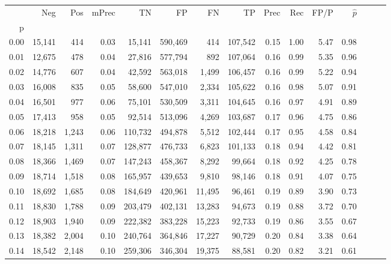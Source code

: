 \begin{tabular}{rrrrrrrrrrrrrrr}
\toprule
{} &     Neg &    Pos & mPrec &       TN &       FP &       FN &       TP &  Prec &   Rec &  FP/P & $\hat{p}$ \\
p    &         &        &       &          &          &          &          &       &       &       &           \\
\midrule
0.00 &  15,141 &    414 &  0.03 &   15,141 &  590,469 &      414 &  107,542 &  0.15 &  1.00 &  5.47 &      0.98 \\
0.01 &  12,675 &    478 &  0.04 &   27,816 &  577,794 &      892 &  107,064 &  0.16 &  0.99 &  5.35 &      0.96 \\
0.02 &  14,776 &    607 &  0.04 &   42,592 &  563,018 &    1,499 &  106,457 &  0.16 &  0.99 &  5.22 &      0.94 \\
0.03 &  16,008 &    835 &  0.05 &   58,600 &  547,010 &    2,334 &  105,622 &  0.16 &  0.98 &  5.07 &      0.91 \\
0.04 &  16,501 &    977 &  0.06 &   75,101 &  530,509 &    3,311 &  104,645 &  0.16 &  0.97 &  4.91 &      0.89 \\
0.05 &  17,413 &    958 &  0.05 &   92,514 &  513,096 &    4,269 &  103,687 &  0.17 &  0.96 &  4.75 &      0.86 \\
0.06 &  18,218 &  1,243 &  0.06 &  110,732 &  494,878 &    5,512 &  102,444 &  0.17 &  0.95 &  4.58 &      0.84 \\
0.07 &  18,145 &  1,311 &  0.07 &  128,877 &  476,733 &    6,823 &  101,133 &  0.18 &  0.94 &  4.42 &      0.81 \\
0.08 &  18,366 &  1,469 &  0.07 &  147,243 &  458,367 &    8,292 &   99,664 &  0.18 &  0.92 &  4.25 &      0.78 \\
0.09 &  18,714 &  1,518 &  0.08 &  165,957 &  439,653 &    9,810 &   98,146 &  0.18 &  0.91 &  4.07 &      0.75 \\
0.10 &  18,692 &  1,685 &  0.08 &  184,649 &  420,961 &   11,495 &   96,461 &  0.19 &  0.89 &  3.90 &      0.73 \\
0.11 &  18,830 &  1,788 &  0.09 &  203,479 &  402,131 &   13,283 &   94,673 &  0.19 &  0.88 &  3.72 &      0.70 \\
0.12 &  18,903 &  1,940 &  0.09 &  222,382 &  383,228 &   15,223 &   92,733 &  0.19 &  0.86 &  3.55 &      0.67 \\
0.13 &  18,382 &  2,004 &  0.10 &  240,764 &  364,846 &   17,227 &   90,729 &  0.20 &  0.84 &  3.38 &      0.64 \\
0.14 &  18,542 &  2,148 &  0.10 &  259,306 &  346,304 &   19,375 &   88,581 &  0.20 &  0.82 &  3.21 &      0.61 \\

\end{tabular}
